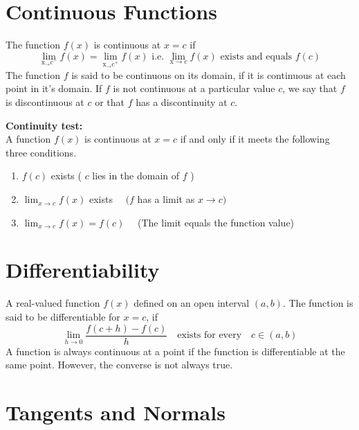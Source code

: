 \section{Continuous Functions}
\begin{definition}
	The function $f(x)$ is continuous at $x=c$ if
	$$
	\lim _{\mathrm{x}_{\rightarrow} c^{-}} f(x)=\lim _{\mathrm{x}_{\rightarrow} c^+} f(x) \text { i.e. } \lim _{\mathrm{x} \rightarrow c} f(x) \text { exists and equals } f(c)
	$$
	The function $f$ is said to be continuous on its domain, if it is continuous at each point in it's domain. If $f$ is not continuous at a particular value  $c$, we say that $f$ is discontinuous at $c$ or that $f$ has a discontinuity at $c$.
\end{definition}
\textbf{\large Continuity test:}\\
A function $f(x)$ is continuous at $x=c$ if and only if it meets the following three conditions.
\begin{enumerate}
	\item $f(c)$ exists
	( $c$ lies in the domain of $f$ )
	\item $\lim _{x \rightarrow c} f(x)$ exists $\quad(f$ has a limit as $x \rightarrow c)$
	\item $\lim _{x \rightarrow c} f(x)=f(c) \quad$ (The limit equals the function value)
\end{enumerate}
\section{Differentiability}
\begin{definition}
	A real-valued function $f(x)$ defined on an open interval $(a, b) .$ The function is said to be differentiable for $x=c$, if
	$$\lim _{h \rightarrow 0} \frac{f(c+h)-f(c)}{h}\quad\text{exists for every}\quad c \in(a, b)$$
	A function is always continuous at a point if the function is differentiable at the same point. However, the converse is not always true.
\end{definition}
\section{Tangents and Normals}
